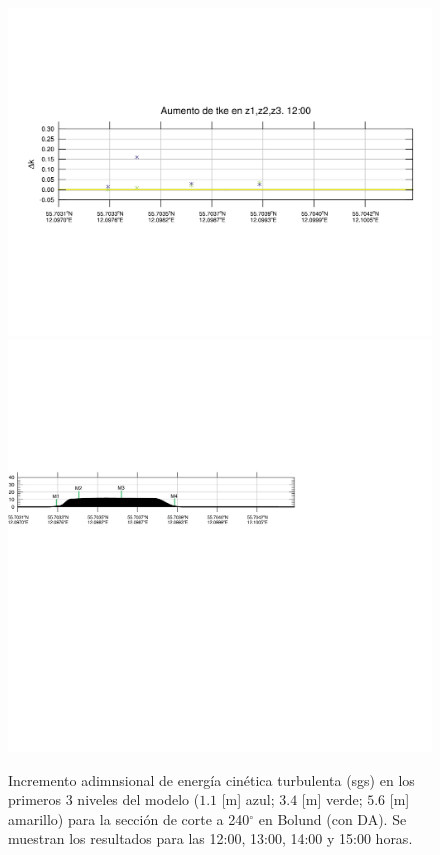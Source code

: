 \begin{figure}[H]
	\includegraphics[width=0.90\linewidth,trim={12mm 84mm 10mm 74mm},page=37,clip]{Imagenes/06/bol_da/delta_tke}\\%
	\includegraphics[width=0.90\linewidth,trim={-13.3mm 193mm 115mm 112mm},clip]{Imagenes/06/bol_da/cross_height}\\%
	\caption{Incremento adimnsional de energía cinética turbulenta (sgs) en los primeros 3 niveles del modelo ($1.1$ [m] azul; $3.4$ [m] verde; $5.6$ [m] amarillo) para la sección de corte a 240$^\circ$ en Bolund (con DA). Se muestran los resultados para las 12:00, 13:00, 14:00 y 15:00 horas.}
	\label{fig:06_bol_da_tke}
\end{figure}

